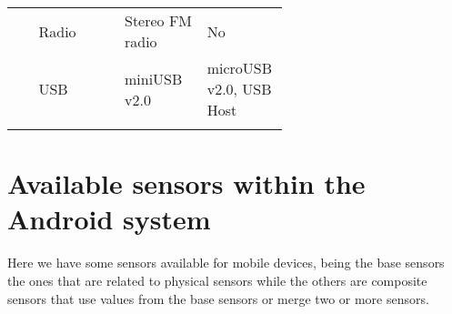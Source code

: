 \begin{longtable}{llp{0.3\linewidth}p{0.3\linewidth}}
         & Radio         & Stereo FM radio                                              & No                                                                                                                                                                                                          \\
         & USB           & miniUSB v2.0                                                 & microUSB v2.0, USB Host                                                                                                                                                                                     \\ \hline
\label{tab:gsmarena-n95-s7}
\end{longtable}





\chapter{Available sensors within the Android system}
\label{ape:android-sensors}

Here we have some sensors available for mobile devices, being the base sensors the ones that are related to physical sensors while the others are composite sensors that use values from the base sensors or merge two or more sensors.


